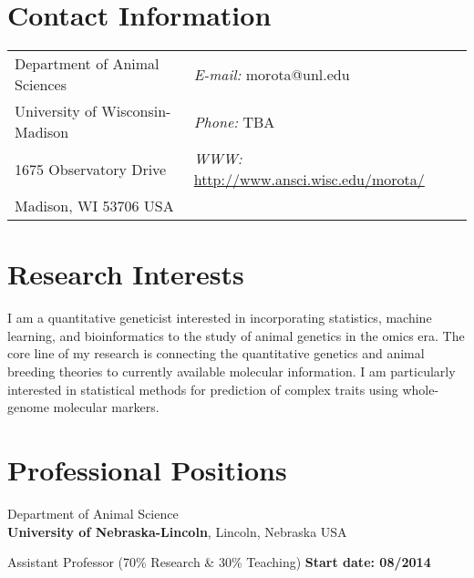 \documentclass[margin,line,10pt]{res}
\begin{document}

\begin{resume}
\section{\sc Contact Information}
\vspace{.05in}
\begin{tabular}{@{}p{2in}p{4in}}
Department of Animal Sciences   & \hspace{2cm} {\it E-mail:}  morota@unl.edu\\       
University of Wisconsin-Madison & \hspace{2cm} {\it Phone:} TBA\\     
1675 Observatory Drive & \hspace{2cm} {\it WWW:} \textcolor{blue}{\href{http://www.ansci.wisc.edu/morota/}{http://www.ansci.wisc.edu/morota/}  }\\
Madison, WI 53706 USA & \\
\end{tabular}


\section{\sc Research Interests}
I am a quantitative geneticist interested in incorporating statistics, machine learning, 
and bioinformatics to the study of animal genetics in the omics era. 
The core line of my research is connecting the quantitative genetics and animal breeding theories to currently available molecular information. 
I am particularly interested in statistical methods for prediction of complex traits using whole-genome molecular markers. 




\section{\sc Professional   Positions}
Department of Animal Science\\
{\bf University of Nebraska-Lincoln}, Lincoln, Nebraska USA
\vspace{-.3cm}

Assistant Professor (70\% Research \& 30\% Teaching)   \hfill {\bf Start date: 08/2014}\\




\end{resume}
\end{document}
